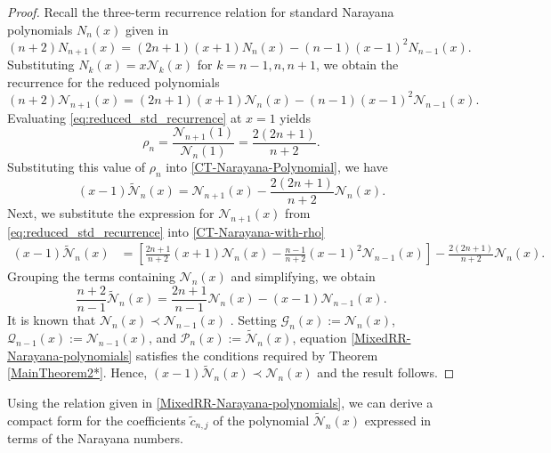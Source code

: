 \documentclass[final,3p,times,12pt]{elsarticle}
\numberwithin{equation}{section}  %
\begin{document}
\begin{proof}
	Recall the three-term recurrence relation for standard Narayana polynomials $N_n(x)$ given in \cite[Eq.~3.3]{Liu-Wang-Unified}
	\begin{equation}\label{TTRR-Narayana}
		(n+2)N_{n+1}(x) = (2n+1)(x+1)N_n(x) - (n-1)(x-1)^2 N_{n-1}(x).
	\end{equation}
	Substituting $N_k(x) = x\mathcal{N}_k(x)$ for $k=n-1, n, n+1$, we obtain the recurrence for the reduced polynomials
	\begin{equation}
		\label{eq:reduced_std_recurrence}
		(n+2)\mathcal{N}_{n+1}(x) = (2n+1)(x+1)\mathcal{N}_n(x) - (n-1)(x-1)^2 \mathcal{N}_{n-1}(x).
	\end{equation}
	Evaluating \eqref{eq:reduced_std_recurrence} at $x=1$ yields
	\begin{equation*}
		\rho_n = \frac{\mathcal{N}_{n+1}(1)}{\mathcal{N}_n(1)} = \frac{2(2n+1)}{n+2}.
	\end{equation*}
	Substituting this value of $\rho_n$ into \eqref{CT-Narayana-Polynomial}, we have
	\begin{equation}\label{CT-Narayana-with-rho}
		(x-1)\tilde{\mathcal{N}}_{n}(x) = \mathcal{N}_{n+1}(x) - \frac{2(2n+1)}{n+2}\mathcal{N}_n(x).
	\end{equation}
	Next, we substitute the expression for $\mathcal{N}_{n+1}(x)$ from \eqref{eq:reduced_std_recurrence} into \eqref{CT-Narayana-with-rho}
	\begin{align*}
		(x-1)\tilde{\mathcal{N}}_{n}(x) &= \left[ \frac{2n+1}{n+2}(x+1)\mathcal{N}_n(x) - \frac{n-1}{n+2}(x-1)^2 \mathcal{N}_{n-1}(x) \right] - \frac{2(2n+1)}{n+2}\mathcal{N}_n(x).
	\end{align*}
	Grouping the terms containing $\mathcal{N}_n(x)$ and simplifying, we obtain
	\begin{equation}\label{MixedRR-Narayana-polynomials}
		\frac{n+2}{n-1}\tilde{\mathcal{N}}_n(x) = \frac{2n+1}{n-1}\mathcal{N}_n(x) - (x-1)\mathcal{N}_{n-1}(x).
	\end{equation}
	It is known that $\mathcal{N}_n(x)\prec \mathcal{N}_{n-1}(x)$  \cite[Corollary 7]{Kostov-Finkelshtein-Shapiro-NarayanaNumbers-JAT-2009}. Setting $\mathcal{G}_{n}(x) := \mathcal{N}_n(x)$, $\mathcal{Q}_{n-1}(x) := \mathcal{N}_{n-1}(x)$, and $\mathcal{P}_n(x) := \tilde{\mathcal{N}}_n(x)$, equation \eqref{MixedRR-Narayana-polynomials} satisfies the conditions required by Theorem \ref{MainTheorem2*}. Hence, $(x-1)\tilde{\mathcal{N}}_{n}(x)\prec \mathcal{N}_{n}(x)$ and the result follows.
\end{proof}
Using the relation given in \eqref{MixedRR-Narayana-polynomials}, we can derive a compact form for the coefficients $\tilde{c}_{n,j}$ of the polynomial $\tilde{\mathcal{N}}_n(x)$ expressed in terms of the Narayana numbers.
\end{document}
